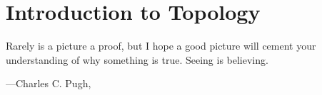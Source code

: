 \documentclass[../main.tex]{subfiles}
\begin{document}
\chapter{Introduction to Topology}
\epigraph{Rarely is a picture a proof, but I hope a good picture will cement your understanding of why something is true. Seeing is believing.}
{---Charles C. Pugh, \cite{pugh-analysis}}




\end{document}
